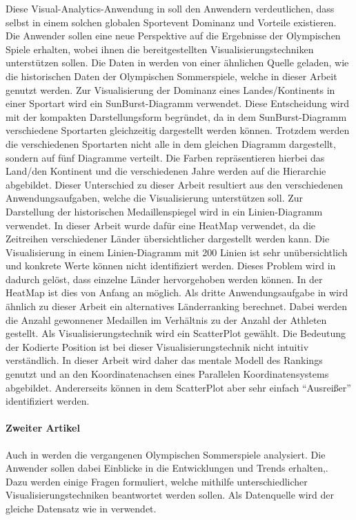 Diese Visual-Analytics-Anwendung in \cite{relWork1} soll den Anwendern verdeutlichen, dass selbst in einem solchen globalen Sportevent Dominanz und Vorteile existieren. Die Anwender sollen eine neue Perspektive auf die Ergebnisse der Olympischen Spiele erhalten, wobei ihnen die bereitgestellten Visualisierungstechniken unterstützen sollen. Die Daten in \cite{relWork1} werden von einer ähnlichen Quelle geladen, wie die historischen Daten der Olympischen Sommerspiele, welche in dieser Arbeit genutzt werden. Zur Visualisierung der Dominanz eines Landes/Kontinents in einer Sportart wird ein SunBurst-Diagramm verwendet. Diese Entscheidung wird mit der kompakten Darstellungsform begründet, da in dem SunBurst-Diagramm verschiedene Sportarten gleichzeitig dargestellt werden können. Trotzdem werden die verschiedenen Sportarten nicht alle in dem gleichen Diagramm dargestellt, sondern auf fünf Diagramme verteilt. Die Farben repräsentieren hierbei das Land/den Kontinent und die verschiedenen Jahre werden auf die Hierarchie abgebildet. Dieser Unterschied zu dieser Arbeit resultiert aus den verschiedenen Anwendungsaufgaben, welche die Visualisierung unterstützen soll. Zur Darstellung der historischen Medaillenspiegel wird in \cite{relWork1} ein Linien-Diagramm verwendet. In dieser Arbeit wurde dafür eine HeatMap verwendet, da die Zeitreihen verschiedener Länder übersichtlicher dargestellt werden kann. Die Visualisierung in einem Linien-Diagramm mit 200 Linien ist sehr unübersichtlich und konkrete Werte können nicht identifiziert werden. Dieses Problem wird in \cite{relWork1} dadurch gelöst, dass einzelne Länder hervorgehoben werden können. In der HeatMap ist dies von Anfang an möglich. Als dritte Anwendungsaufgabe in \cite{relWork1} wird ähnlich zu dieser Arbeit ein alternatives Länderranking berechnet. Dabei werden die Anzahl gewonnener Medaillen im Verhältnis zu der Anzahl der Athleten gestellt. Als Visualisierungstechnik wird ein ScatterPlot gewählt. Die Bedeutung der Kodierte Position ist bei dieser Visualisierungstechnik nicht intuitiv verständlich. In dieser Arbeit wird daher das mentale Modell des Rankings genutzt und an den Koordinatenachsen eines Parallelen Koordinatensystems abgebildet. Andererseits können in dem ScatterPlot aber sehr einfach \enquote{Ausreißer} identifiziert werden.

\paragraph{Zweiter Artikel}
Auch in \cite{relWork2} werden die vergangenen Olympischen Sommerspiele analysiert. Die Anwender sollen dabei Einblicke in die Entwicklungen und Trends erhalten,. Dazu werden einige Fragen formuliert, welche mithilfe unterschiedlicher Visualisierungstechniken beantwortet werden sollen. Als Datenquelle wird der gleiche Datensatz wie in \cite{relWork1} verwendet.


